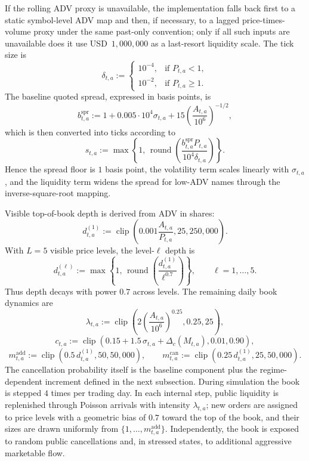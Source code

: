 \documentclass[11pt,a4paper]{article}
\begin{document}
If the rolling ADV proxy is unavailable, the implementation falls back first to
a static symbol-level ADV map and then, if necessary, to a lagged
price-times-volume proxy under the same past-only convention; only if all such
inputs are unavailable does it use USD~\(1{,}000{,}000\) as a last-resort
liquidity scale. The tick size is
\[
  \delta_{t,a}
  :=
  \begin{cases}
    10^{-4}, & \text{if } P_{t,a}<1,\\
    10^{-2}, & \text{if } P_{t,a}\ge 1.
  \end{cases}
\]
The baseline quoted spread, expressed in basis points, is
\[
  b_{t,a}^{\mathrm{spr}}
  :=
  1
  +
  0.005\cdot 10^{4}\sigma_{t,a}
  +
  15\left(\frac{A_{t,a}}{10^{6}}\right)^{-1/2},
\]
which is then converted into ticks according to
\[
  s_{t,a}
  :=
  \max\left\{
    1,\,
    \operatorname{round}
    \left(
      \frac{b_{t,a}^{\mathrm{spr}}P_{t,a}}{10^{4}\delta_{t,a}}
    \right)
  \right\}.
\]
Hence the spread floor is \(1\) basis point, the volatility term scales linearly
with \(\sigma_{t,a}\), and the liquidity term widens the spread for low-ADV
names through the inverse-square-root mapping.

Visible top-of-book depth is derived from ADV in shares:
\[
  d_{t,a}^{(1)}
  :=
  \operatorname{clip}
  \left(
    0.001\frac{A_{t,a}}{P_{t,a}},
    25,
    250{,}000
  \right).
\]
With \(L=5\) visible price levels, the level-\(\ell\) depth is
\[
  d_{t,a}^{(\ell)}
  :=
  \max\left\{
    1,\,
    \operatorname{round}
    \left(
      \frac{d_{t,a}^{(1)}}{\ell^{0.7}}
    \right)
  \right\},
  \qquad \ell=1,\dots,5.
\]
Thus depth decays with power \(0.7\) across levels. The remaining daily book
dynamics are
\[
  \lambda_{t,a}
  :=
  \operatorname{clip}
  \left(
    2\left(\frac{A_{t,a}}{10^{6}}\right)^{0.25},
    0.25,
    25
  \right),
\]
\[
  c_{t,a}
  :=
  \operatorname{clip}
  \left(
    0.15 + 1.5\,\sigma_{t,a} + \Delta_c(M_{t,a}),
    0.01,
    0.90
  \right),
\]
\[
  m_{t,a}^{\mathrm{add}}
  :=
  \operatorname{clip}
  \left(
    0.5\,d_{t,a}^{(1)},
    50,
    50{,}000
  \right),
  \qquad
  m_{t,a}^{\mathrm{can}}
  :=
  \operatorname{clip}
  \left(
    0.25\,d_{t,a}^{(1)},
    25,
    50{,}000
  \right).
\]
The cancellation probability itself is the baseline component plus the
regime-dependent increment defined in the next subsection. During simulation
the book is stepped \(4\) times per trading day. In each
internal step, public liquidity is replenished through Poisson arrivals with
intensity \(\lambda_{t,a}\); new orders are assigned to price levels with a
geometric bias of \(0.7\) toward the top of the book, and their sizes are drawn
uniformly from \(\{1,\dots,m_{t,a}^{\mathrm{add}}\}\). Independently, the book
is exposed to random public cancellations and, in stressed states, to
additional aggressive marketable flow.
\end{document}
